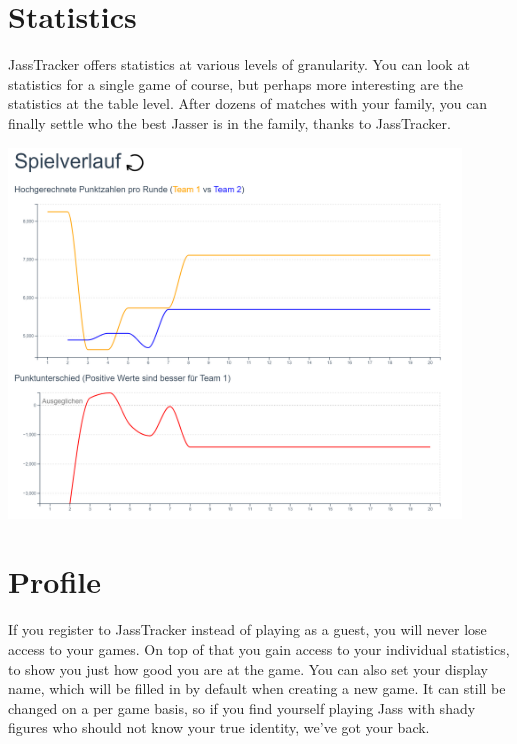 \section*{Statistics}
JassTracker offers statistics at various levels of granularity. You can look at statistics for a single game of course, but perhaps more interesting are the statistics at the table level. After dozens of matches with your family, you can finally settle who the best Jasser is in the family, thanks to JassTracker.

\includegraphics[width=0.9\textwidth]{resources/screenshots/statistics}

\section*{Profile}
If you register to JassTracker instead of playing as a guest, you will never lose access to your games. On top of that you gain access to your individual statistics, to show you just how good you are at the game. You can also set your display name, which will be filled in by default when creating a new game. It can still be changed on a per game basis, so if you find yourself playing Jass with shady figures who should not know your true identity, we've got your back.
